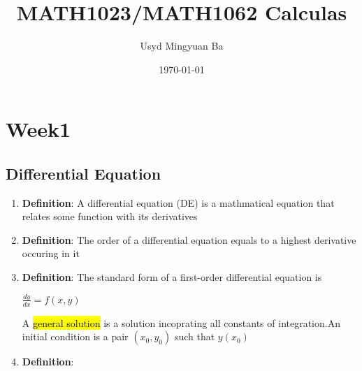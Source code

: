 \documentclass{article}
\title{MATH1023/MATH1062 Calculas}
\author{Usyd Mingyuan Ba}
\date{\today}
\begin{document}
\maketitle

\section{Week1}
\subsection{Differential Equation}
\begin{enumerate}

  \item \textbf{Definition}: A differential equation (DE) is a mathmatical equation that relates some function with its derivatives

  \item \textbf{Definition}: The order of a differential equation equals to a highest derivative occuring in it

  \item \textbf{Definition}: The standard form of a first-order differential equation is 
    \begin{center}
      $\frac{dy}{dx} = f(x,y)$
    \end{center}
    A \hl{general solution} is a solution incoprating all constants of integration.An initial condition is a pair $(x_0,y_0)$ such that $y(x_0)$
  \item \textbf{Definition}: 
\end{enumerate}
\end{document}
